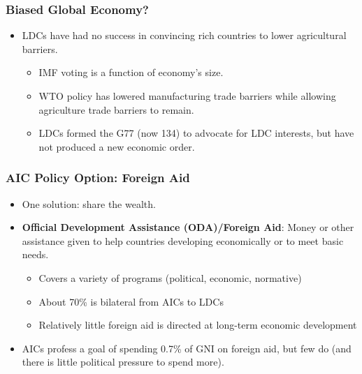 \documentclass[handout]{beamer}
\begin{document}
\begin{frame} 
	\frametitle{\LARGE{Biased Global Economy?}}
	\begin{itemize}
		\item LDCs have had no success in convincing rich countries to lower agricultural barriers. \pause 
		\begin{itemize}
			\item IMF voting is a function of economy's size. \pause 
			\item WTO policy has lowered manufacturing trade barriers while allowing agriculture trade barriers to remain. \pause 
			\item LDCs formed the G77 (now 134) to advocate for LDC interests, but have not produced a new economic order.  
		\end{itemize}
	\end{itemize}
\end{frame}

\begin{frame} 
	\frametitle{\LARGE{AIC Policy Option: Foreign Aid}}
	\begin{itemize}
			\item One solution: share the wealth. \pause  
			\item \textbf{Official Development Assistance (ODA)/Foreign Aid}: Money or other assistance given to help countries developing economically or to meet basic needs. \pause 
			\begin{itemize}
			    \item Covers a variety of programs (political, economic, normative) \pause 
			    \item About 70\% is bilateral from AICs to LDCs \pause 
			    \item Relatively little foreign aid is directed at long-term economic development \pause 
			\end{itemize}
			\item AICs profess a goal of spending 0.7\% of GNI on foreign aid, but few do (and there is little political pressure to spend more).
	\end{itemize}
\end{frame}
\end{document}
